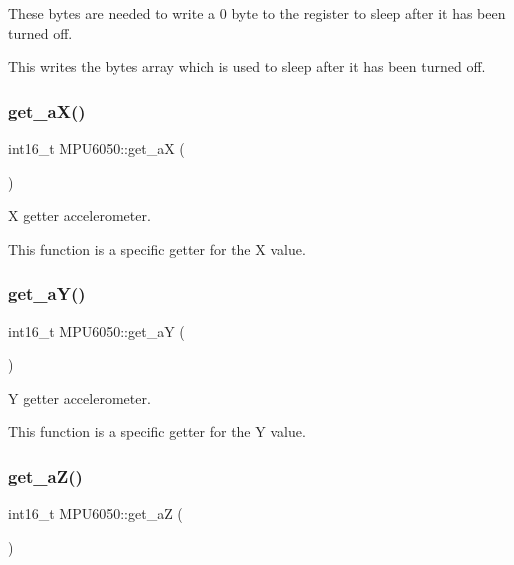 These bytes are needed to write a 0 byte to the register to sleep after it has been turned off.

This writes the bytes array which is used to sleep after it has been turned off. \mbox{\label{classMPU6050_ad25208622b16528a729e674ca808222b}} 
\subsubsection{\texorpdfstring{get\+\_\+a\+X()}{get\_aX()}}
{\footnotesize\ttfamily int16\+\_\+t M\+P\+U6050\+::get\+\_\+aX (\begin{DoxyParamCaption}{ }\end{DoxyParamCaption})}



X getter accelerometer. 

This function is a specific getter for the X value. \mbox{\label{classMPU6050_aedccda658db98a9876415beec8a6537f}} 
\subsubsection{\texorpdfstring{get\+\_\+a\+Y()}{get\_aY()}}
{\footnotesize\ttfamily int16\+\_\+t M\+P\+U6050\+::get\+\_\+aY (\begin{DoxyParamCaption}{ }\end{DoxyParamCaption})}



Y getter accelerometer. 

This function is a specific getter for the Y value. \mbox{\label{classMPU6050_aee0faebb35251e349f1ab29d7bf4e39c}} 
\subsubsection{\texorpdfstring{get\+\_\+a\+Z()}{get\_aZ()}}
{\footnotesize\ttfamily int16\+\_\+t M\+P\+U6050\+::get\+\_\+aZ (\begin{DoxyParamCaption}{ }\end{DoxyParamCaption})}



